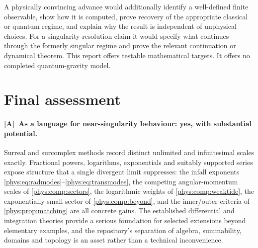 \documentclass[11pt,letterpaper]{article}
\numberwithin{equation}{section}
\theoremstyle{definition}
\theoremstyle{remark}
\newcommand{\TA}{\textcolor{TierA}{\textsf{\bfseries[A]}}}
\begin{document}
A physically convincing advance would additionally identify a well-defined
finite observable, show how it is computed, prove recovery of the appropriate
classical or quantum regime, and explain why the result is independent of
unphysical choices. For a singularity-resolution claim it would specify what
continues through the formerly singular regime and prove the relevant
continuation or dynamical theorem. This report offers testable mathematical
targets. It offers no completed quantum-gravity model.

\section{Final assessment}
\label{phys:sec:conclusion}

\paragraph{\TA\ As a language for near-singularity behaviour: yes, with
substantial potential.}
Surreal and surcomplex methods record distinct unlimited and infinitesimal
scales exactly. Fractional powers, logarithms, exponentials and suitably
supported series expose structure that a single divergent limit suppresses: the
infall exponents \eqref{phys:eq:radmodes}--\eqref{phys:eq:transmodes}, the
competing angular-momentum scales of
\cref{phys:comp:sectors}, the logarithmic weights of
\cref{phys:comp:weaktide}, the exponentially small sector of
\cref{phys:comp:beyond}, and the inner/outer criteria of
\cref{phys:prop:matching} are all concrete gains. The established differential
and integration theories provide a serious foundation for selected extensions
beyond elementary examples, and the repository's separation of algebra,
summability, domains and topology is an asset rather than a technical
inconvenience.
\end{document}
